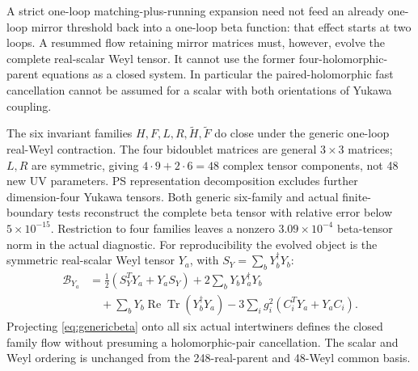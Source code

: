 \documentclass[11pt]{article}
\newcommand{\tr}{\operatorname{Tr}}
\newcommand{\B}{\mathcal B}
\begin{document}
A strict one-loop matching-plus-running expansion need not feed an
already one-loop mirror threshold back into a one-loop beta function:
that effect starts at two loops. A resummed flow retaining mirror
matrices must, however, evolve the complete real-scalar Weyl tensor.
It cannot use the former four-holomorphic-parent equations as a closed
system. In particular the paired-holomorphic fast cancellation cannot
be assumed for a scalar with both orientations of Yukawa coupling.

The six invariant families $H,F,L,R,\widetilde H,\widetilde F$ do close
under the generic one-loop real-Weyl contraction. The four bidoublet
matrices are general $3\times3$ matrices; $L,R$ are symmetric, giving
$4\cdot9+2\cdot6=48$ complex tensor components, not 48 new UV parameters.
PS representation decomposition excludes further dimension-four
Yukawa tensors. Both generic six-family and actual finite-boundary
tests reconstruct the complete beta tensor with relative error below
$5\times10^{-15}$. Restriction to four families leaves a nonzero
$3.09\times10^{-4}$ beta-tensor norm in the actual diagnostic.
For reproducibility the evolved object is the symmetric real-scalar
Weyl tensor $Y_a$, with $S_Y=\sum_bY_b^\dagger Y_b$:
\begin{align}
 \B_{Y_a}&=\tfrac12(S_Y^TY_a+Y_aS_Y)
 +2\sum_bY_bY_a^\dagger Y_b\nonumber\\
 &\quad+\sum_bY_b\operatorname{Re}\tr(Y_b^\dagger Y_a)
 -3\sum_i g_i^2(C_i^TY_a+Y_aC_i). \label{eq:genericbeta}
\end{align}
Projecting \eqref{eq:genericbeta} onto all six actual intertwiners
defines the closed family flow without presuming a holomorphic-pair
cancellation. The scalar and Weyl ordering is unchanged from the
248-real-parent and 48-Weyl common basis.
\end{document}
